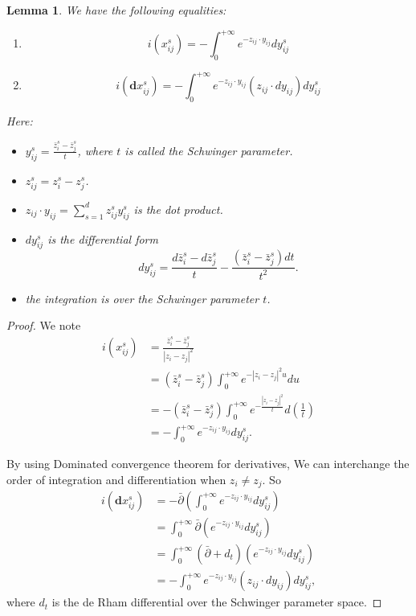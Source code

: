 \documentclass[11pt]{amsart}
\newtheorem{lem}[thm]{Lemma}
\theoremstyle{definition}
\theoremstyle{remark}
\numberwithin{equation}{section}
\begin{document}
\begin{lem}
    We have the following equalities:
    \begin{enumerate}
        \item 
        $$
        i(x_{ij}^{s})=-\int_{0}^{+\infty}e^{-z_{ij}\cdot y_{ij}}dy_{ij}^{s}
        $$
        \item 
        $$
        i(\mathbf{d}x_{ij}^{s})=-\int_{0}^{+\infty}e^{-z_{ij}\cdot y_{ij}}(z_{ij}\cdot dy_{ij})dy_{ij}^{s}
        $$
    \end{enumerate}
    Here:
        \begin{itemize}
            \item $y_{ij}^{s}=\frac{\bar{z}_{i}^{s}-\bar{z}_{j}^{s}}{t}$, where $t$ is called the Schwinger parameter.
            \item $z_{ij}^{s}=z_{i}^{s}-z_{j}^{s}$.
            \item 
            $z_{ij}\cdot y_{ij}=\sum_{s=1}^{d}z_{ij}^{s}y_{ij}^{s}$ is the dot product.
            \item $dy_{ij}^{s}$ is the differential form
            $$
            dy_{ij}^{s}=\frac{d\bar{z}_{i}^{s}-d\bar{z}_{j}^{s}}{t}-\frac{(\bar{z}_{i}^{s}-\bar{z}_{j}^{s})dt}{t^{2}}.
            $$
            \item the integration is over the Schwinger parameter $t$.
        \end{itemize}
\end{lem}
\begin{proof}
    We note
    \begin{align*}
        i(x_{ij}^{s})
        &=
        \frac{\bar{z}_{i}^{s} - \bar{z}_{j}^{s}}{|z_{i} - z_{j}|^{2}}\\
        &=
        (\bar{z}_{i}^{s} - \bar{z}_{j}^{s})\int_{0}^{+\infty}e^{-|z_{i} - z_{j}|^{2}u}du\\
        &=
        -(\bar{z}_{i}^{s} - \bar{z}_{j}^{s})\int_{0}^{+\infty}e^{-\frac{|z_{i} - z_{j}|^{2}}{t}}d\left(\frac{1}{t}\right)\\
        &=
        -\int_{0}^{+\infty}e^{-z_{ij}\cdot y_{ij}}dy_{ij}^{s}.
    \end{align*}

    By using Dominated convergence theorem for derivatives, We can interchange the order of integration and differentiation when $z_{i}\neq z_{j}$. So 
    \begin{align*}
        i(\mathbf{d}x_{ij}^{s})
        &=
        -\bar{\partial}\left(\int_{0}^{+\infty}e^{-z_{ij}\cdot y_{ij}}dy_{ij}^{s}\right)\\
        &=
        \int_{0}^{+\infty}\bar{\partial}\left(e^{-z_{ij}\cdot y_{ij}}dy_{ij}^{s}\right)\\
        &=
        \int_{0}^{+\infty}(\bar{\partial}+d_{t})\left(e^{-z_{ij}\cdot y_{ij}}dy_{ij}^{s}\right)\\
        &=
        -\int_{0}^{+\infty}e^{-z_{ij}\cdot y_{ij}}(z_{ij}\cdot dy_{ij})dy_{ij}^{s},
    \end{align*}
    where $d_t$ is the de Rham differential over the Schwinger parameter space.
\end{proof}
\end{document}
